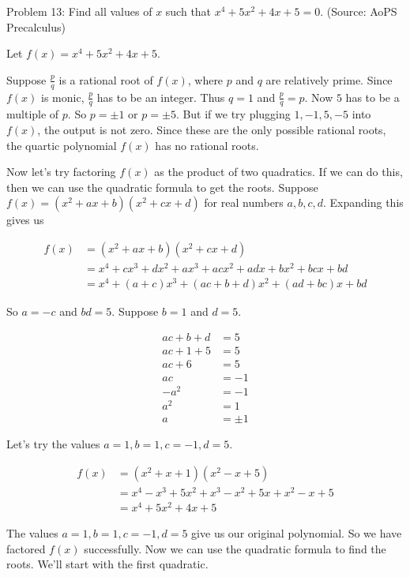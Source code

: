 Problem 13: Find all values of $x$ such that $x^4 + 5x^2 + 4x + 5 = 0$. (Source: AoPS Precalculus)

Let $f(x) = x^4 + 5x^2 + 4x + 5$.

Suppose $\frac{p}{q}$ is a rational root of $f(x)$, where $p$ and $q$ are relatively prime. Since $f(x)$ is monic, $\frac{p}{q}$ has to be an integer. Thus $q = 1$ and $\frac{p}{q} = p$. Now $5$ has to be a multiple of $p$. So $p = \pm 1$ or $p = \pm 5$. But if we try plugging $1, -1, 5, -5$ into $f(x)$, the output is not zero. Since these are the only possible rational roots, the quartic polynomial $f(x)$ has no rational roots.

Now let's try factoring $f(x)$ as the product of two quadratics. If we can do this, then we can use the quadratic formula to get the roots. Suppose $f(x) = (x^2 + ax + b)(x^2 + cx + d)$ for real numbers $a, b, c, d$. Expanding this gives us

\begin{align*}
f(x) &= (x^2 + ax + b)(x^2 + cx + d) \\
&= x^4 + cx^3 + dx^2 + ax^3 + acx^2 + adx + bx^2 + bcx + bd \\
&= x^4 + (a + c)x^3 + (ac + b + d)x^2 + (ad + bc)x + bd
\end{align*}

So $a = -c$ and $bd = 5$. Suppose $b = 1$ and $d = 5$.

\begin{align*}
ac + b + d &= 5 \\
ac + 1 + 5 &= 5 \\
ac + 6 &= 5 \\
ac &= -1 \\
-a^2 &= -1 \\
a^2 &= 1 \\
a &= \pm 1
\end{align*}

Let's try the values $a = 1, b = 1, c = -1, d = 5$.

\begin{align*}
f(x) &= (x^2 + x + 1)(x^2 - x + 5) \\
&= x^4 - x^3 + 5x^2 + x^3 - x^2 + 5x + x^2 - x + 5 \\
&= x^4 + 5x^2 + 4x + 5
\end{align*}

The values $a = 1, b = 1, c = -1, d = 5$ give us our original polynomial. So we have factored $f(x)$ successfully. Now we can use the quadratic formula to find the roots. We'll start with the first quadratic.

